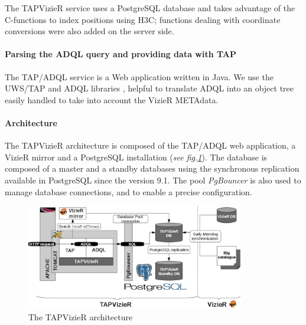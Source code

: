 \documentclass[11pt]{article}
\begin{document}
The TAPVizieR service uses a PostgreSQL database and takes advantage of the
C-functions to index positions using H3C;  functions dealing with 
coordinate conversions were also added on the server side.

%

\paragraph{Parsing the ADQL query and providing data with TAP}

The TAP/ADQL service is a Web application written in Java. 
We use the UWS/TAP and ADQL libraries \citep{simbad_tap_2011}, 
helpful to translate ADQL into an object tree 
easily handled to take into account the VizieR METAdata. 


\paragraph{Architecture}
The TAPVizieR architecture is composed of the TAP/ADQL web application, a VizieR
mirror and a PostgreSQL installation (\textit{see fig.\ref{P044:architecture}}).
The database is composed of a master and a standby databases using
the synchronous replication available in PostgreSQL since the version 9.1.
The pool {\em PgBouncer} is also used to manage database connections, and to
enable a precise configuration. 

\begin{figure}[hbp] \center
\includegraphics[width=0.85\textwidth]{P044_fig1.eps}
\caption{The TAPVizieR architecture}\label{P044:architecture}
\end{figure}
\end{document}
